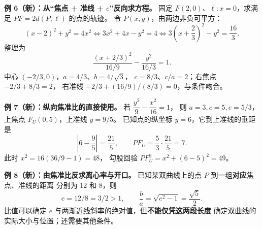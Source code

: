 \clearpage
\begin{examplebox}
\textbf{例 6（新）：从“焦点 + 准线 + $e$”反向求方程。}
固定 $F(2,0)$、$\ell:x=0$，求满足 $PF=2d(P,\ell)$ 的点的轨迹。
令 $P(x,y)$，由两边非负可平方：
\[
(x-2)^2+y^2=4x^2
\Longleftrightarrow 3x^2+4x-y^2=4
\Longleftrightarrow 3\left(x+\frac23\right)^2-y^2=\frac{16}{3}.
\]
整理为
\[
\boxed{\frac{(x+2/3)^2}{16/9}-\frac{y^2}{16/3}=1}.
\]
中心 $(-2/3,0)$，$a=4/3$、$b=4/\sqrt3$，
$c=8/3$、$c/a=2$；右焦点 $-2/3+8/3=2$，
右准线 $-2/3+(16/9)/(8/3)=0$，与条件吻合。

\medskip
\end{examplebox}
\clearpage
\begin{examplebox}
\textbf{例 7（新）：纵向焦准比的直接使用。}
若 $\dfrac{y^2}{9}-\dfrac{x^2}{16}=1$，
则 $a=3,c=5,e=5/3$，上焦点 $F_U(0,5)$，上准线 $y=9/5$。
已知点的纵坐标 $y=6$，它到上准线的垂距是
\[
\left|6-\frac95\right|=\frac{21}{5},
\qquad PF_U=\frac53\cdot\frac{21}{5}=\boxed7.
\]
此时 $x^2=16(36/9-1)=48$，
勾股回验 $PF_U^2=x^2+(6-5)^2=49$。

\medskip
\textbf{例 8（新）：由焦准比反求离心率与开口。}
已知某双曲线上的点 $P$ 到一组\textbf{对应}焦点、准线的距离
分别为 $12$ 和 $8$，则
\[
\boxed{e=12/8=3/2>1},\qquad
\boxed{\frac ba=\sqrt{e^2-1}=\frac{\sqrt5}{2}}.
\]
比值可以确定 $e$ 与两渐近线斜率的绝对值，但\textbf{不能仅凭这两段长度}
确定双曲线的实际大小与位置；还需要其他条件。
\end{examplebox}

